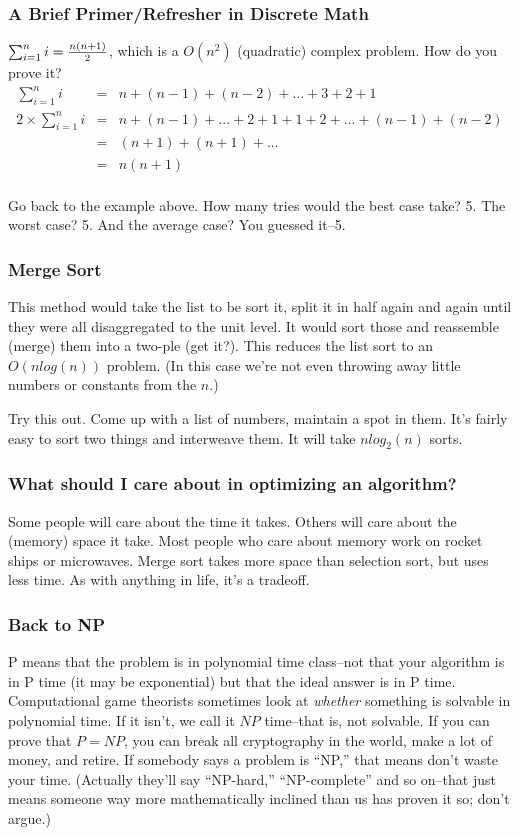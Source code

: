 \documentclass[12pt,letter]{article}
\begin{document}
\subsubsection{A Brief Primer/Refresher in Discrete Math}
$\sum_{i=1}^{n} i = {n(n+1) \over 2}$, which is a $O(n^2)$ (quadratic)
complex problem. How do you prove it? 
\begin{eqnarray*}
\sum_{i=1}^{n} i &=& n + (n-1) + (n-2) + ... + 3 + 2 + 1 \\
2 \times \sum_{i=1}^{n} i&=& n+ (n-1) + ... + 2 + 1 + 1 + 2 + ... + (n-1) + (n - 2) \\
&=& (n+1) + (n+1) + ... \\
&=& n(n+1) \\
\end{eqnarray*}

Go back to the example above. How many tries would the best case take?
5. The worst case? 5. And the average case? You guessed it--5. 

\subsubsection{Merge Sort}

This method would take the list to be sort it, split it in half again
and again until they were all disaggregated to the unit level. It would sort those and
reassemble (merge) them into a two-ple (get it?). This reduces the
list sort to an $O(n log(n))$ problem. (In this case we're not even
throwing away little numbers or constants from the $n$.)

Try this out. Come up with a list of numbers, maintain a spot in
them. It's fairly easy to sort two things and interweave them. It will
take $n log_2(n)$ sorts. 



\subsubsection{What should I care about in optimizing an algorithm?}
Some people will care about the time it takes. Others will care about
the (memory) space it take. Most people who care about memory work on rocket
ships or microwaves. Merge sort takes more space than selection sort,
but uses less time. As with anything in life, it's a tradeoff. 

\subsubsection{Back to NP}
P means that the problem is in polynomial time class--not that your
algorithm is in P time (it may be exponential) but that the ideal
answer is in P time. Computational game theorists sometimes look at
\emph{whether} something is solvable in polynomial time. If it isn't,
we call it $NP$ time--that is, not solvable. If you can prove that
$P=NP$, you can break all cryptography in the world, make a lot of
money, and retire. If somebody says a problem is ``NP,'' that means
don't waste your time. (Actually they'll say ``NP-hard,''
``NP-complete'' and so on--that just means someone way more
mathematically inclined than us has proven it so; don't argue.)
\end{document}
